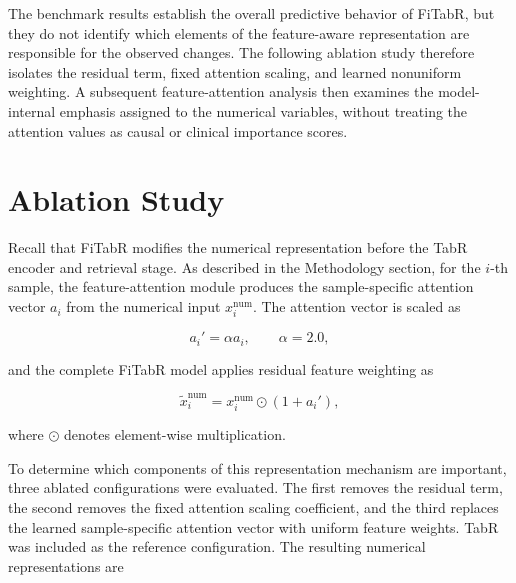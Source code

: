 \documentclass[11pt,a4paper,oneside, openany, reqno, chapter, nokorean]{oblivoir}
\theoremstyle{definition}
\theoremstyle{remark}
\numberwithin{equation}{chapter}
\theoremstyle{definition}
\theoremstyle{remark}
\theoremstyle{definition}
\begin{document}
The benchmark results establish the overall predictive behavior of FiTabR,
but they do not identify which elements of the feature-aware representation
are responsible for the observed changes. The following ablation study
therefore isolates the residual term, fixed attention scaling, and
learned nonuniform weighting. A subsequent feature-attention analysis then
examines the model-internal emphasis assigned to the numerical variables,
without treating the attention values as causal or clinical importance
scores.

\FloatBarrier
\section{Ablation Study}
\label{sec:ablation}

Recall that FiTabR modifies the numerical representation before the
TabR encoder and retrieval stage. As described in the Methodology
section, for the $i$-th sample, the feature-attention module produces
the sample-specific attention vector $a_i$ from the numerical input
$x_i^{\mathrm{num}}$. The attention vector is scaled as

\begin{equation}
a_i' = \alpha a_i,
\qquad \alpha = 2.0,
\label{eq:ablation_scale}
\end{equation}

and the complete FiTabR model applies residual feature weighting as

\begin{equation}
\tilde{x}_i^{\mathrm{num}}
=
x_i^{\mathrm{num}}
\odot
\left(1+a_i'\right),
\label{eq:ablation_fitabr}
\end{equation}

where $\odot$ denotes element-wise multiplication.

To determine which components of this representation mechanism are
important, three ablated configurations were evaluated. The first removes
the residual term, the second removes the fixed attention scaling
coefficient, and the third replaces the learned sample-specific
attention vector with uniform feature weights. TabR was included as the
reference configuration. The resulting numerical representations are
\end{document}
